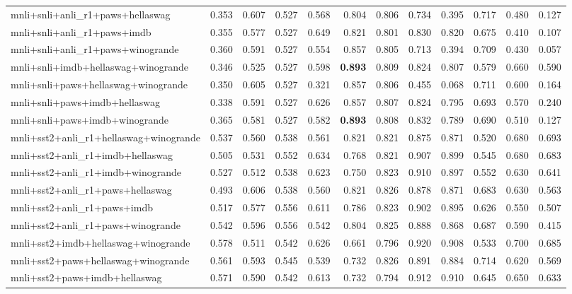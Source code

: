 \begin{table}[t]
\begin{tabular}{lrrrrrrrrrrr}
    mnli+snli+anli\_r1+paws+hellaswag & 0.353 & 0.607 & 0.527 & 0.568 & 0.804 & 0.806 & 0.734 & 0.395 & 0.717 & 0.480 & 0.127 \\
    mnli+snli+anli\_r1+paws+imdb & 0.355 & 0.577 & 0.527 & 0.649 & 0.821 & 0.801 & 0.830 & 0.820 & 0.675 & 0.410 & 0.107 \\
    mnli+snli+anli\_r1+paws+winogrande & 0.360 & 0.591 & 0.527 & 0.554 & 0.857 & 0.805 & 0.713 & 0.394 & 0.709 & 0.430 & 0.057 \\
    mnli+snli+imdb+hellaswag+winogrande & 0.346 & 0.525 & 0.527 & 0.598 & \textbf{0.893} & 0.809 & 0.824 & 0.807 & 0.579 & 0.660 & 0.590 \\
    mnli+snli+paws+hellaswag+winogrande & 0.350 & 0.605 & 0.527 & 0.321 & 0.857 & 0.806 & 0.455 & 0.068 & 0.711 & 0.600 & 0.164 \\
    mnli+snli+paws+imdb+hellaswag & 0.338 & 0.591 & 0.527 & 0.626 & 0.857 & 0.807 & 0.824 & 0.795 & 0.693 & 0.570 & 0.240 \\
    mnli+snli+paws+imdb+winogrande & 0.365 & 0.581 & 0.527 & 0.582 & \textbf{0.893} & 0.808 & 0.832 & 0.789 & 0.690 & 0.510 & 0.127 \\
    mnli+sst2+anli\_r1+hellaswag+winogrande & 0.537 & 0.560 & 0.538 & 0.561 & 0.821 & 0.821 & 0.875 & 0.871 & 0.520 & 0.680 & 0.693 \\
    mnli+sst2+anli\_r1+imdb+hellaswag & 0.505 & 0.531 & 0.552 & 0.634 & 0.768 & 0.821 & 0.907 & 0.899 & 0.545 & 0.680 & 0.683 \\
    mnli+sst2+anli\_r1+imdb+winogrande & 0.527 & 0.512 & 0.538 & 0.623 & 0.750 & 0.823 & 0.910 & 0.897 & 0.552 & 0.630 & 0.641 \\
    mnli+sst2+anli\_r1+paws+hellaswag & 0.493 & 0.606 & 0.538 & 0.560 & 0.821 & 0.826 & 0.878 & 0.871 & 0.683 & 0.630 & 0.563 \\
    mnli+sst2+anli\_r1+paws+imdb & 0.517 & 0.577 & 0.556 & 0.611 & 0.786 & 0.823 & 0.902 & 0.895 & 0.626 & 0.550 & 0.507 \\
    mnli+sst2+anli\_r1+paws+winogrande & 0.542 & 0.596 & 0.556 & 0.542 & 0.804 & 0.825 & 0.888 & 0.868 & 0.687 & 0.590 & 0.415 \\
    mnli+sst2+imdb+hellaswag+winogrande & 0.578 & 0.511 & 0.542 & 0.626 & 0.661 & 0.796 & 0.920 & 0.908 & 0.533 & 0.700 & 0.685 \\
    mnli+sst2+paws+hellaswag+winogrande & 0.561 & 0.593 & 0.545 & 0.539 & 0.732 & 0.826 & 0.891 & 0.884 & 0.714 & 0.620 & 0.569 \\
    mnli+sst2+paws+imdb+hellaswag & 0.571 & 0.590 & 0.542 & 0.613 & 0.732 & 0.794 & 0.912 & 0.910 & 0.645 & 0.650 & 0.633 \\

\end{tabular}
\end{table}
